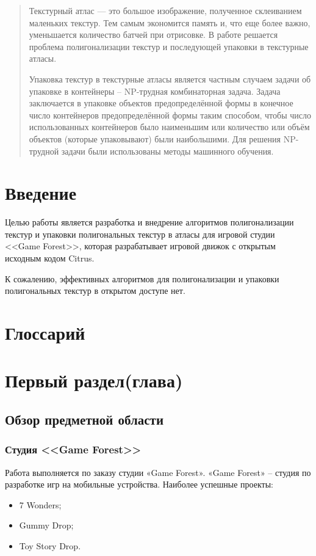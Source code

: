 \documentclass{fefu_thesis/cls/fefu}
\author{Терехов Д.Е.}
\begin{document}
    \tableofcontents
    \pagebreak
    \begin{abstract}
        Текстурный атлас — это большое изображение, полученное склеиванием маленьких текстур. Тем самым экономится память и, что еще более важно, уменьшается количество батчей при отрисовке. В работе решается проблема полигонализации текстур и последующей упаковки в текстурные атласы.

        Упаковка текстур в текстурные атласы является частным случаем задачи об упаковке в контейнеры -- NP-трудная комбинаторная задача. Задача заключается в упаковке объектов предопределённой формы в конечное число контейнеров предопределённой формы таким способом, чтобы число использованных контейнеров было наименьшим или количество или объём объектов (которые упаковывают) были наибольшими. Для решения NP-трудной задачи были использованы методы машинного обучения.
    \end{abstract}
    \section*{Введение}
        Целью работы является разработка и внедрение алгоритмов полигонализации текстур и упаковки полигональных текстур в атласы для игровой студии <<Game Forest>>\cite{SGFSite}, которая разрабатывает игровой движок с открытым исходным кодом Citrus\cite{CitrusRepo}.

        К сожалению, эффективных алгоритмов для полигонализации и упаковки полигональных текстур в открытом доступе нет.
    \section{Глоссарий}
    \section{Первый раздел(глава)}
    \subsection{Обзор предметной области}
    \subsubsection{Студия <<Game Forest>>}
    Работа выполняется по заказу студии «Game Forest». «Game Forest» – студия
по разработке игр на мобильные устройства. Наиболее успешные проекты:
    \begin{itemize}
        \item 7 Wonders;
        \item Gummy Drop;
        \item Toy Story Drop.
    \end{itemize}
\end{document}
